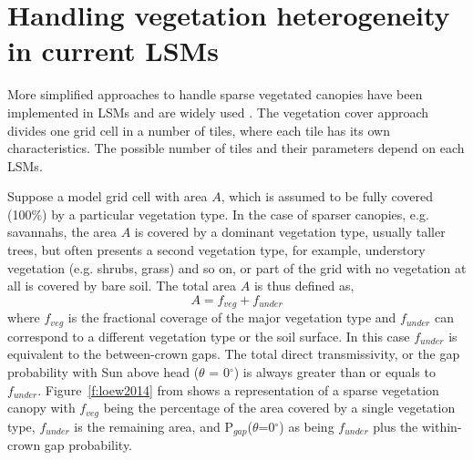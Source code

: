 \section{Handling vegetation heterogeneity in current LSMs}\label{sec:fveg}

More simplified approaches to handle sparse vegetated canopies have been implemented in LSMs and are widely used \citep{loew2014}. The vegetation cover approach divides one grid cell in a number of tiles, where each tile has its own characteristics. The possible number of tiles and their parameters depend on each LSMs.

Suppose a model grid cell with area $A$, which is assumed to be fully covered (100\%) by a particular vegetation type. In the case of sparser canopies, e.g. savannahs, the area $A$ is covered by a dominant vegetation type, usually taller trees, but often presents a second vegetation type, for example, understory vegetation (e.g. shrubs, grass) and so on, or part of the grid with no vegetation at all is covered by bare soil. The total area $A$ is thus defined as,
\begin{equation}
A = f_{veg} + f_{under}
\label{equation:area}
\end{equation}
\noindent where $f_{veg}$ is the fractional coverage of the major vegetation type and $f_{under}$ can correspond to a different vegetation type or the soil surface.
In this case $f_{under}$ is equivalent to the between-crown gaps. The total direct transmissivity, or the gap probability with Sun above head ($\theta$ = 0$^{\circ}$) is always greater than or equals to $f_{under}$. Figure~\ref{f:loew2014} from \citet{loew2014} shows a representation of a sparse vegetation canopy with $f_{veg}$ being the percentage of the area covered by a single vegetation type, $f_{under}$ is the remaining area, and P$_{gap}$($\theta$=0$^{\circ}$) as being $f_{under}$ plus the within-crown gap probability.

